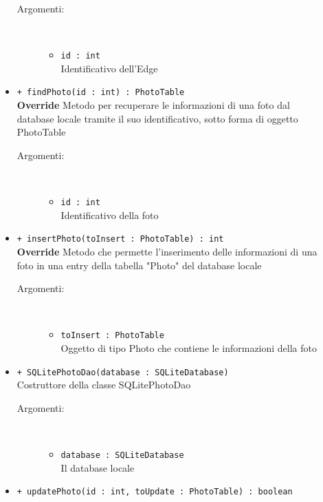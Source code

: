 \documentclass[../DefinizioneDiProdotto.tex]{subfiles}
\begin{document}
\begin{description}
\begin{itemize}
 \begin{description}
\item[Argomenti:] \
\begin{itemize}
\item \texttt{id : int}\\
Identificativo dell'Edge\end{itemize}
\end{description}
\item \texttt{+ findPhoto(id : int) : PhotoTable}\\
\textbf{Override} Metodo per recuperare le informazioni di una foto dal database locale tramite il suo identificativo, sotto forma di oggetto PhotoTable
 \begin{description}
\item[Argomenti:] \
\begin{itemize}
\item \texttt{id : int}\\
Identificativo della foto\end{itemize}
\end{description}
\item \texttt{+ insertPhoto(toInsert : PhotoTable) : int}\\
\textbf{Override} Metodo che permette l'inserimento delle informazioni di una foto in una entry della tabella "Photo" del database locale
 \begin{description}
\item[Argomenti:] \
\begin{itemize}
\item \texttt{toInsert : PhotoTable}\\
Oggetto di tipo Photo che contiene le informazioni della foto\end{itemize}
\end{description}
\item \texttt{+ SQLitePhotoDao(database : SQLiteDatabase)}\\
Costruttore della classe SQLitePhotoDao
 \begin{description}
\item[Argomenti:] \
\begin{itemize}
\item \texttt{database : SQLiteDatabase}\\
Il database locale\end{itemize}
\end{description}
\item \texttt{+ updatePhoto(id : int, toUpdate : PhotoTable) : boolean}\\

\end{itemize}
\end{description}
\end{document}
